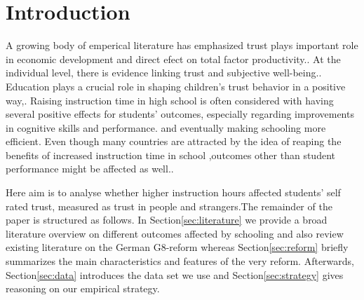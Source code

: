 \documentclass[11pt, a4paper, leqno]{article}
\begin{document}
\section{Introduction\label{sec:introduction}}
A growing body of emperical literature has emphasized trust plays important role 
in economic development and direct efect on total factor productivity.\autocite{knack1997does}.
At the individual level, there is evidence linking trust and subjective well-being.\citep{helliwell2010trust}. 
Education plays a crucial role in shaping children's trust behavior in a positive way,\citep{glaeser2007does}.  
Raising instruction time in high school is often considered with having several positive effects for students'
outcomes,  especially regarding improvements in cognitive skills and performance.\citep{huebener2017increased}  
and eventually making schooling more efficient.  Even though many countries are attracted by the idea of 
reaping the benefits of increased instruction time in school \citep{oecd2016},outcomes other than student performance 
might be affected as well.\citep{dahmann2014impact,dahmann2018cross,hofmann2018learning}.\par
Here aim is to analyse whether higher instruction hours affected students' self rated trust, 
measured as trust in people and strangers.The remainder of the paper is structured as follows. 
In Section\ref{sec:literature} we provide a broad literature overview on different outcomes affected 
by schooling and also review existing literature on the German G8-reform whereas 
Section\ref{sec:reform} briefly summarizes the main characteristics and features of the 
very reform. Afterwards, Section\ref{sec:data} introduces the data set we use and
Section\ref{sec:strategy} gives reasoning on our empirical strategy.
\end{document}
